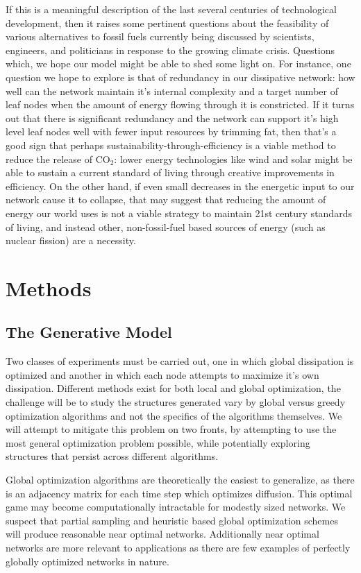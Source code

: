 \documentclass{paper}
\begin{document}
	If this is a meaningful description of the last several centuries of technological development, then it raises some pertinent questions about the feasibility of various alternatives to fossil fuels currently being discussed by scientists, engineers, and politicians in response to the growing climate crisis. Questions which, we hope our model might be able to shed some light on. For instance, one question we hope to explore is that of redundancy in our dissipative network: how well can the network maintain it's internal complexity and a target number of leaf nodes when the amount of energy flowing through it is constricted. If it turns out that there is significant redundancy and the network can support it's high level leaf nodes well with fewer input resources by trimming fat, then that's a good sign that perhaps sustainability-through-efficiency is a viable method to reduce the release of CO$_{2}$: lower energy technologies like wind and solar might be able to sustain a current standard of living through creative improvements in efficiency. On the other hand, if even small decreases in the energetic input to our network cause it to collapse, that may suggest that reducing the amount of energy our world uses is not a viable strategy to maintain 21st century standards of living, and instead other, non-fossil-fuel based sources of energy (such as nuclear fission) are a necessity. 
	
	\section{Methods}
	
	\subsection{The Generative Model}
	
	Two classes of experiments must be carried out, one in which global dissipation is optimized and another in which each node attempts to maximize it's own dissipation. Different methods exist for both local and global optimization, the challenge will be to study the structures generated vary by global versus greedy optimization algorithms and not the specifics of the algorithms themselves. We will attempt to mitigate this problem on two fronts, by attempting to use the most general optimization problem possible, while potentially exploring structures that persist across different algorithms. 
	
	Global optimization algorithms are theoretically the easiest to generalize, as there is an adjacency matrix for each time step which optimizes diffusion. This optimal game may become computationally intractable for modestly sized networks. We suspect that partial sampling and heuristic based global optimization schemes will produce reasonable near optimal networks. Additionally near optimal networks are more relevant to applications as there are few examples of perfectly globally optimized networks in nature.
	
\end{document}
